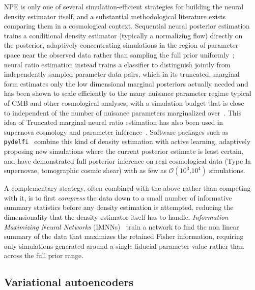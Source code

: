 NPE is only one of several simulation-efficient strategies for building the neural density estimator itself, and a substantial methodological literature exists comparing them in a cosmological context. Sequential neural posterior estimation trains a conditional density estimator (typically a normalizing flow) directly on the posterior, adaptively concentrating simulations in the region of parameter space near the observed data rather than sampling the full prior uniformly~\citep[e.g.][]{greenberg2019automaticposteriortransformationlikelihoodfree}; neural ratio estimation instead trains a classifier to distinguish jointly from independently sampled parameter-data pairs, which in its truncated, marginal form estimates only the low dimensional marginal posteriors actually needed and has been shown to scale efficiently to the many nuisance parameter regime typical of CMB and other cosmological analyses, with a simulation budget that is close to independent of the number of nuisance parameters marginalized over~\citep{TMNRE,Cole_2022}. This idea of Truncated marginal neural ratio estimation has also been used in supernova cosmology and parameter inference~\citet{Karchev_2022}. Software packages such as \texttt{pydelfi}~\citep{Alsing_2019} combine this kind of density estimation with active learning, adaptively proposing new simulations where the current posterior estimate is least certain, and have demonstrated full posterior inference on real cosmological data (Type Ia supernovae, tomographic cosmic shear) with as few as $\mathcal{O}(10^3\text{,}10^4)$ simulations.

A complementary strategy, often combined with the above rather than competing with it, is to first \emph{compress} the data down to a small number of informative summary statistics before any density estimation is attempted, reducing the dimensionality that the density estimator itself has to handle. \emph{Information Maximizing Neural Networks} (IMNNs)~\citep{Charnock_2018,Makinen_2022} train a network to find the non linear summary of the data that maximizes the retained Fisher information, requiring only simulations generated around a single fiducial parameter value rather than across the full prior range.

\subsection{Variational autoencoders}
\label{sec:vae}

